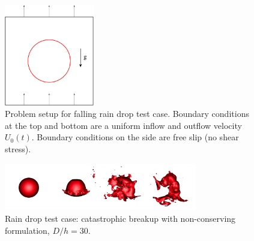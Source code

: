\begin{figure}
\begin{center}
\includegraphics[width=0.35\textwidth]{Figures/setup.pdf}
\end{center}
\caption{Problem setup for falling rain drop test case. Boundary conditions 
at the top and bottom are a uniform inflow and outflow velocity $U_0(t)$. 
Boundary conditions on the side are free slip (no shear stress).}
\label{setup}
\end{figure}

\begin{figure}
\begin{center}
\includegraphics[width=0.75\textwidth]{Figures/cata.png}
\end{center}
\caption{Rain drop test case: catastrophic breakup with non-conserving 
formulation, $D/h=30$.}
\label{cata}
\end{figure}

